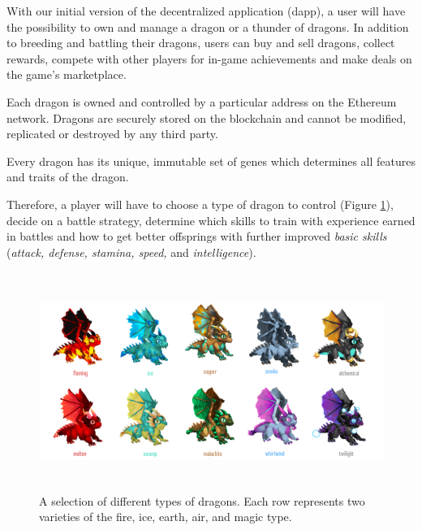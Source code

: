 \documentclass[12pt]{article}
\begin{document}
With our initial version of the decentralized application (dapp), a user will have the possibility to own and manage a dragon or a thunder of dragons. In addition to breeding and battling their dragons, users can buy and sell dragons, collect rewards, compete with other players for in-game achievements and make deals on the game’s marketplace.\par

Each dragon is owned and controlled by a particular address on the Ethereum network. Dragons are securely stored on the blockchain and cannot be modified, replicated or destroyed by any third party.\par

Every dragon has its unique, immutable set of genes which determines all features and traits of the dragon.\par

Therefore, a player will have to choose a type of dragon to control (Figure \ref{fig:A_selection_of_different_types_of_dragons__Each_row_represents_two_varieties_of_the_fire_ice_earth_air_and_magic_type_}), decide on a battle strategy, determine which skills to train with experience earned in battles and how to get better offsprings with further improved \textit{basic skills} (\textit{attack, defense, stamina, speed, }and\textit{ intelligence}). \par




\begin{Center}
\begin{figure}[!ht]
	\begin{Center}		\includegraphics[width=6.27in,height=2.79in]{./media/image13.png}
		\caption{A selection of different types of dragons.  Each row represents two varieties of the fire, ice, earth, air, and magic type. }
		\label{fig:A_selection_of_different_types_of_dragons__Each_row_represents_two_varieties_of_the_fire_ice_earth_air_and_magic_type_}
	\end{Center}\end{figure}
\end{Center}
\end{document}
